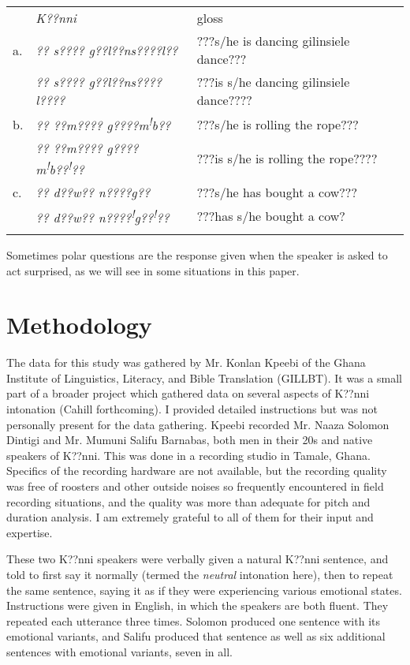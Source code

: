 \documentclass[output=paper]{langsci/langscibook}
\begin{document}
\begin{tabularx}{\textwidth}{XXX} & \emph{K??nni } & gloss\\
\lsptoprule
a. & \emph{?? s???? g??l??ns????l??} & ???s/he is dancing gilinsiele dance???\\
& \emph{?? s???? g??l??ns????l????  } & ???is s/he dancing gilinsiele dance????\\
b. & \emph{?? ??m???? g????m}\textit{\textsuperscript{!}}\emph{b??} & ???s/he is rolling the rope???\\
& \emph{?? ??m???? g????m}\textit{\textsuperscript{!}}\emph{b??}\textit{\textsuperscript{!}}\emph{??} & ???is s/he is rolling the rope????\\
c. & \emph{?? d??w?? n????g??  } & ???s/he has bought a cow???\\
& \emph{?? d??w?? n????}\textit{\textsuperscript{!}}\emph{g??}\textit{\textsuperscript{!}}\emph{??  } & ???has s/he bought a cow?\\
\lspbottomrule
\end{tabularx}
Sometimes polar questions are the response given when the speaker is asked to act surprised, as we will see in some situations in this paper. 

\section{Methodology}

The data for this study was gathered by Mr. Konlan Kpeebi of the Ghana Institute of Linguistics, Literacy, and Bible Translation (GILLBT). It was a small part of a broader project which gathered data on several aspects of K??nni intonation (Cahill forthcoming). I provided detailed instructions but was not personally present for the data gathering. Kpeebi recorded Mr. Naaza Solomon Dintigi and Mr. Mumuni Salifu Barnabas, both men in their 20s and native speakers of K??nni. This was done in a recording studio in Tamale, Ghana. Specifics of the recording hardware are not available, but the recording quality was free of roosters and other outside noises so frequently encountered in field recording situations, and the quality was more than adequate for pitch and duration analysis. I am extremely grateful to all of them for their input and expertise.


These two K??nni speakers were verbally given a natural K??nni sentence, and told to first say it normally (termed the \emph{neutral} intonation here), then to repeat the same sentence, saying it as if they were experiencing various emotional states. Instructions were given in English, in which the speakers are both fluent. They repeated each utterance three times. Solomon produced one sentence with its emotional variants, and Salifu produced that sentence as well as six additional sentences with emotional variants, seven in all.
\end{document}
